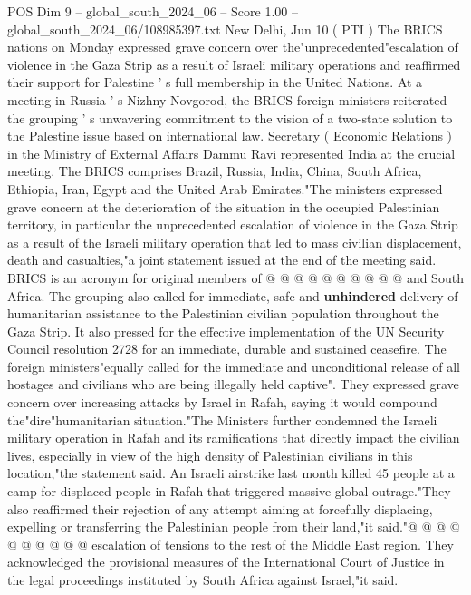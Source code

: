 \begin{textsample}{POS Dim 9 – global\_south\_2024\_06 – Score 1.00 – global\_south\_2024\_06/108985397.txt}  \label{ex:f9_pos_055}
New Delhi, Jun 10 ( PTI ) The BRICS nations on Monday expressed grave concern over the"unprecedented"escalation of violence in the Gaza Strip as a result of Israeli military operations and reaffirmed their support for Palestine ' s full membership in the United Nations.
At a meeting in Russia ' s Nizhny Novgorod, the BRICS foreign ministers reiterated the grouping ' s unwavering commitment to the vision of a two-state solution to the Palestine issue based on international law.
Secretary ( Economic Relations ) in the Ministry of External Affairs Dammu Ravi represented India at the crucial meeting.
The BRICS comprises Brazil, Russia, India, China, South Africa, Ethiopia, Iran, Egypt and the United Arab Emirates."The ministers expressed grave concern at the deterioration of the situation in the occupied Palestinian territory, in particular the unprecedented escalation of violence in the Gaza Strip as a result of the Israeli military operation that led to mass civilian displacement, death and casualties,"a joint statement issued at the end of the meeting said.
BRICS is an acronym for original members of @ @ @ @ @ @ @ @ @ @ and South Africa.
The grouping also called for immediate, safe and \textbf{unhindered} delivery of humanitarian assistance to the Palestinian civilian population throughout the Gaza Strip.
It also pressed for the effective implementation of the UN Security Council resolution 2728 for an immediate, durable and sustained ceasefire.
The foreign ministers"equally called for the immediate and unconditional release of all hostages and civilians who are being illegally held captive".
They expressed grave concern over increasing attacks by Israel in Rafah, saying it would compound the"dire"humanitarian situation."The Ministers further condemned the Israeli military operation in Rafah and its ramifications that directly impact the civilian lives, especially in view of the high density of Palestinian civilians in this location,"the statement said.
An Israeli airstrike last month killed 45 people at a camp for displaced people in Rafah that triggered massive global outrage."They also reaffirmed their rejection of any attempt aiming at forcefully displacing, expelling or transferring the Palestinian people from their land,"it said."@ @ @ @ @ @ @ @ @ @ escalation of tensions to the rest of the Middle East region.
They acknowledged the provisional measures of the International Court of Justice in the legal proceedings instituted by South Africa against Israel,"it said.

\end{textsample}

